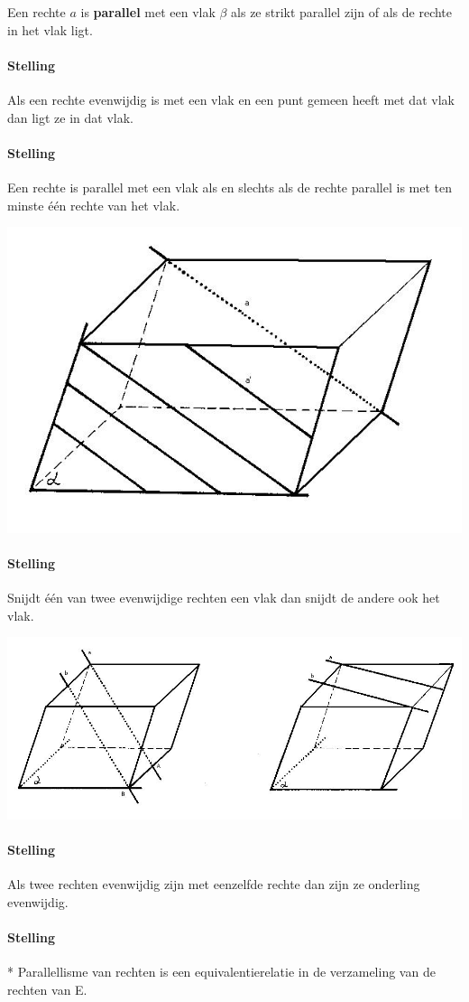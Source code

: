 \documentclass[12pt,twoside]{article}
\begin{document}
\begin{theorie}
Een rechte $a$ is {\bf parallel} met een vlak $\beta$ als ze strikt parallel zijn of als de rechte in het vlak ligt.

\paragraph*{Stelling}
Als een rechte evenwijdig is met een vlak en een punt gemeen heeft met dat vlak dan ligt ze in dat vlak.

\paragraph*{Stelling}
Een rechte is parallel met een vlak als en slechts als de rechte parallel is met ten minste één rechte van het vlak.
\begin{center}
  \includegraphics[width=.5\textwidth]{stelling_3}
\end{center}

\paragraph*{Stelling}
Snijdt één van twee evenwijdige rechten een vlak dan snijdt de andere ook het vlak.
\begin{center}
  \includegraphics[width=\textwidth]{stelling_4}
\end{center}


\paragraph*{Stelling}
Als twee rechten evenwijdig zijn met eenzelfde rechte dan zijn ze onderling evenwijdig.

\paragraph*{Stelling}*
Parallellisme van rechten is een equivalentierelatie in de verzameling van de rechten van E.

\end{theorie}
\end{document}
